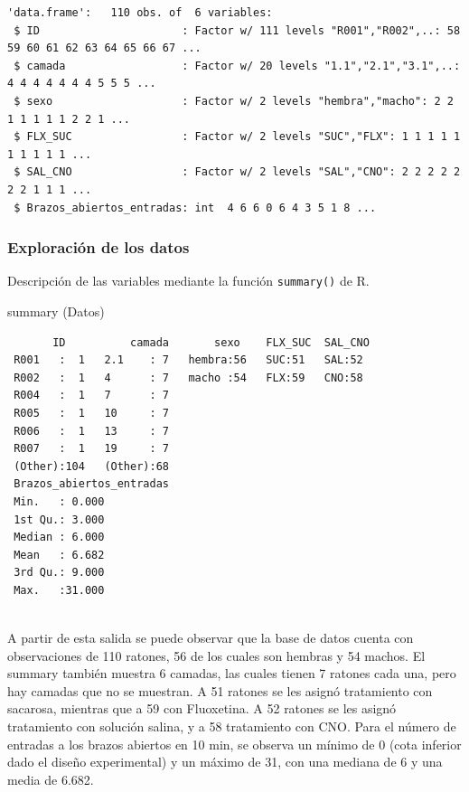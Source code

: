 \documentclass[
  letterpaper,
  DIV=11,
  numbers=noendperiod]{scrartcl}
\newenvironment{Shaded}{\begin{snugshade}}{\end{snugshade}}
\newcommand{\FunctionTok}[1]{\textcolor[rgb]{0.28,0.35,0.67}{#1}}
\newcommand{\NormalTok}[1]{\textcolor[rgb]{0.00,0.23,0.31}{#1}}
\begin{document}
\begin{verbatim}
'data.frame':   110 obs. of  6 variables:
 $ ID                      : Factor w/ 111 levels "R001","R002",..: 58 59 60 61 62 63 64 65 66 67 ...
 $ camada                  : Factor w/ 20 levels "1.1","2.1","3.1",..: 4 4 4 4 4 4 4 5 5 5 ...
 $ sexo                    : Factor w/ 2 levels "hembra","macho": 2 2 1 1 1 1 1 2 2 1 ...
 $ FLX_SUC                 : Factor w/ 2 levels "SUC","FLX": 1 1 1 1 1 1 1 1 1 1 ...
 $ SAL_CNO                 : Factor w/ 2 levels "SAL","CNO": 2 2 2 2 2 2 2 1 1 1 ...
 $ Brazos_abiertos_entradas: int  4 6 6 0 6 4 3 5 1 8 ...
\end{verbatim}

\subsubsection{\texorpdfstring{\textbf{Exploración de los
datos}}{Exploración de los datos}}\label{exploraciuxf3n-de-los-datos}

Descripción de las variables mediante la función \texttt{summary()} de
R.

\begin{Shaded}
\begin{Highlighting}[]
\FunctionTok{summary}\NormalTok{ (Datos)}
\end{Highlighting}
\end{Shaded}

\begin{verbatim}
       ID          camada       sexo    FLX_SUC  SAL_CNO 
 R001   :  1   2.1    : 7   hembra:56   SUC:51   SAL:52  
 R002   :  1   4      : 7   macho :54   FLX:59   CNO:58  
 R004   :  1   7      : 7                                
 R005   :  1   10     : 7                                
 R006   :  1   13     : 7                                
 R007   :  1   19     : 7                                
 (Other):104   (Other):68                                
 Brazos_abiertos_entradas
 Min.   : 0.000          
 1st Qu.: 3.000          
 Median : 6.000          
 Mean   : 6.682          
 3rd Qu.: 9.000          
 Max.   :31.000          
                         
\end{verbatim}

A partir de esta salida se puede observar que la base de datos cuenta
con observaciones de 110 ratones, 56 de los cuales son hembras y 54
machos. El summary también muestra 6 camadas, las cuales tienen 7
ratones cada una, pero hay camadas que no se muestran. A 51 ratones se
les asignó tratamiento con sacarosa, mientras que a 59 con Fluoxetina. A
52 ratones se les asignó tratamiento con solución salina, y a 58
tratamiento con CNO. Para el número de entradas a los brazos abiertos en
10 min, se observa un mínimo de 0 (cota inferior dado el diseño
experimental) y un máximo de 31, con una mediana de 6 y una media de
6.682.
\end{document}
